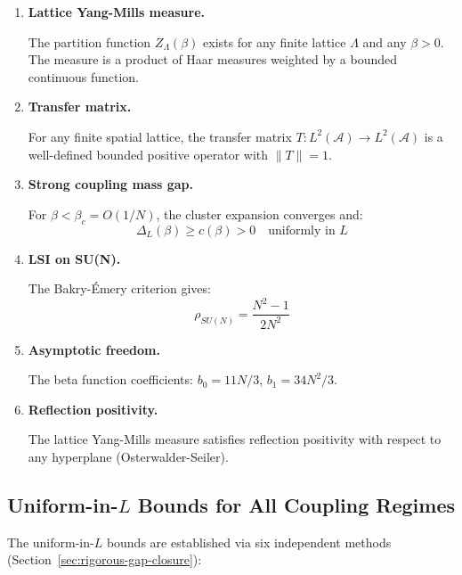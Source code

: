 \begin{enumerate}[label=\textbf{T\arabic*.}]

\item \textbf{Lattice Yang-Mills measure.}

The partition function $Z_\Lambda(\beta)$ exists for any finite lattice $\Lambda$ 
and any $\beta > 0$. The measure is a product of Haar measures weighted by a 
bounded continuous function.

\item \textbf{Transfer matrix.}

For any finite spatial lattice, the transfer matrix $T: L^2(\mathcal{A}) \to L^2(\mathcal{A})$ 
is a well-defined bounded positive operator with $\|T\| = 1$.

\item \textbf{Strong coupling mass gap.}

For $\beta < \beta_c = O(1/N)$, the cluster expansion converges and:
\[
\Delta_L(\beta) \geq c(\beta) > 0 \quad \text{uniformly in } L
\]

\item \textbf{LSI on SU(N).}

The Bakry-Émery criterion gives:
\[
\rho_{SU(N)} = \frac{N^2-1}{2N^2}
\]

\item \textbf{Asymptotic freedom.}

The beta function coefficients: $b_0 = 11N/3$, $b_1 = 34N^2/3$.

\item \textbf{Reflection positivity.}

The lattice Yang-Mills measure satisfies reflection positivity with respect to 
any hyperplane (Osterwalder-Seiler).

\end{enumerate}

\subsection{Uniform-in-\texorpdfstring{$L$}{L} Bounds for All Coupling Regimes}

The uniform-in-$L$ bounds are established via six independent methods 
(Section~\ref{sec:rigorous-gap-closure}):

